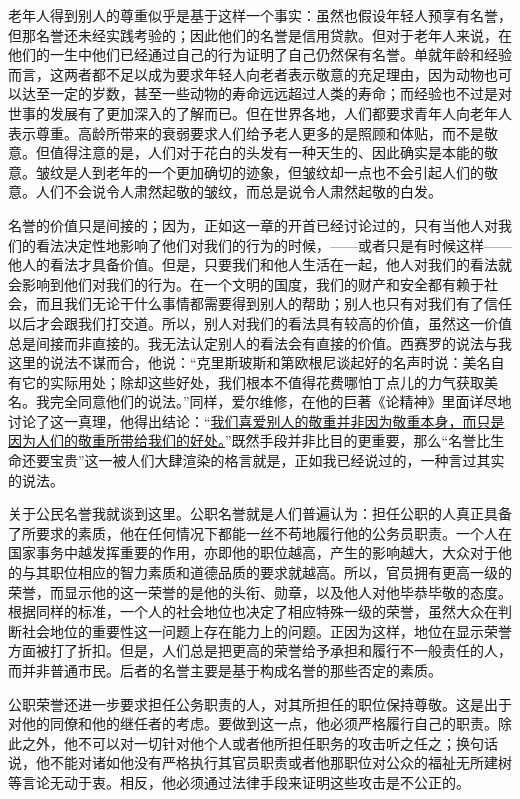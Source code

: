 \documentclass[12pt,oneside]{book}
\begin{document}
老年人得到别人的尊重似乎是基于这样一个事实：虽然也假设年轻人预享有名誉，但那名誉还未经实践考验的；因此他们的名誉是信用贷款。但对于老年人来说，在他们的一生中他们已经通过自己的行为证明了自己仍然保有名誉。单就年龄和经验而言，这两者都不足以成为要求年轻人向老者表示敬意的充足理由，因为动物也可以达至一定的岁数，甚至一些动物的寿命远远超过人类的寿命；而经验也不过是对世事的发展有了更加深入的了解而已。但在世界各地，人们都要求青年人向老年人表示尊重。高龄所带来的衰弱要求人们给予老人更多的是照顾和体贴，而不是敬意。但值得注意的是，人们对于花白的头发有一种天生的、因此确实是本能的敬意。皱纹是人到老年的一个更加确切的迹象，但皱纹却一点也不会引起人们的敬意。人们不会说令人肃然起敬的皱纹，而总是说令人肃然起敬的白发。 

名誉的价值只是间接的；因为，正如这一章的开首已经讨论过的，只有当他人对我们的看法决定性地影响了他们对我们的行为的时候，——或者只是有时候这样——他人的看法才具备价值。但是，只要我们和他人生活在一起，他人对我们的看法就会影响到他们对我们的行为。在一个文明的国度，我们的财产和安全都有赖于社会，而且我们无论干什么事情都需要得到别人的帮助；别人也只有对我们有了信任以后才会跟我们打交道。所以，别人对我们的看法具有较高的价值，虽然这一价值总是间接而非直接的。我无法认定别人的看法会有直接的价值。西赛罗的说法与我这里的说法不谋而合，他说：“克里斯玻斯和第欧根尼谈起好的名声时说：美名自有它的实际用处；除却这些好处，我们根本不值得花费哪怕丁点儿的力气获取美名。我完全同意他们的说法。”同样，爱尔维修，在他的巨著《论精神》里面详尽地讨论了这一真理，他得出结论：“\uline{我们喜爱别人的敬重并非因为敬重本身，而只是因为人们的敬重所带给我们的好处。}”既然手段并非比目的更重要，那么“名誉比生命还要宝贵”这一被人们大肆渲染的格言就是，正如我已经说过的，一种言过其实的说法。 

关于公民名誉我就谈到这里。公职名誉就是人们普遍认为：担任公职的人真正具备了所要求的素质，他在任何情况下都能一丝不苟地履行他的公务员职责。一个人在国家事务中越发挥重要的作用，亦即他的职位越高，产生的影响越大，大众对于他的与其职位相应的智力素质和道德品质的要求就越高。所以，官员拥有更高一级的荣誉，而显示他的这一荣誉的是他的头衔、勋章，以及他人对他毕恭毕敬的态度。根据同样的标准，一个人的社会地位也决定了相应特殊一级的荣誉，虽然大众在判断社会地位的重要性这一问题上存在能力上的问题。正因为这样，地位在显示荣誉方面被打了折扣。但是，人们总是把更高的荣誉给予承担和履行不一般责任的人，而并非普通市民。后者的名誉主要是基于构成名誉的那些否定的素质。 

公职荣誉还进一步要求担任公务职责的人，对其所担任的职位保持尊敬。这是出于对他的同僚和他的继任者的考虑。要做到这一点，他必须严格履行自己的职责。除此之外，他不可以对一切针对他个人或者他所担任职务的攻击听之任之；换句话说，他不能对诸如他没有严格执行其官员职责或者他那职位对公众的福祉无所建树等言论无动于衷。相反，他必须通过法律手段来证明这些攻击是不公正的。 
\end{document}
